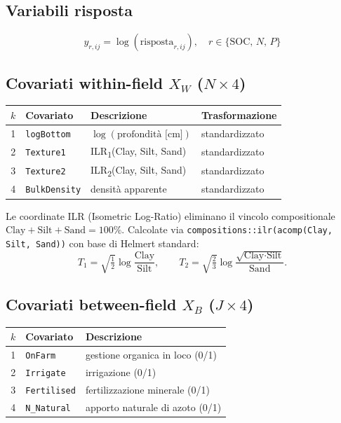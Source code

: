\documentclass[11pt, a4paper]{article}
\newcommand{\SOC}{\mathrm{SOC}}
\begin{document}
\subsection{Variabili risposta}

\[
  y_{r,ij} = \log(\text{risposta}_{r,ij}), \quad r \in \{\SOC,\, N,\, P\}
\]

\subsection{Covariati within-field $X_W$ ($N \times 4$)}

\medskip
\begin{tabular}{@{}clll@{}}
\toprule
$k$ & Covariato & Descrizione & Trasformazione \\
\midrule
1 & \texttt{logBottom} & $\log(\text{profondità [cm]})$ & standardizzato \\
2 & \texttt{Texture1}  & ILR\textsubscript{1}(Clay, Silt, Sand) & standardizzato \\
3 & \texttt{Texture2}  & ILR\textsubscript{2}(Clay, Silt, Sand) & standardizzato \\
4 & \texttt{BulkDensity} & densità apparente & standardizzato \\
\bottomrule
\end{tabular}

\medskip
Le coordinate ILR (Isometric Log-Ratio) eliminano il vincolo compositionale
$\text{Clay} + \text{Silt} + \text{Sand} = 100\%$. Calcolate via
\texttt{compositions::ilr(acomp(Clay, Silt, Sand))} con base di Helmert standard:
\[
  T_1 = \sqrt{\tfrac{1}{2}} \log\!\frac{\text{Clay}}{\text{Silt}},
  \qquad
  T_2 = \sqrt{\tfrac{2}{3}} \log\!\frac{\sqrt{\text{Clay}\cdot\text{Silt}}}{\text{Sand}}.
\]

\subsection{Covariati between-field $X_B$ ($J \times 4$)}

\medskip
\begin{tabular}{@{}cll@{}}
\toprule
$k$ & Covariato & Descrizione \\
\midrule
1 & \texttt{OnFarm} & gestione organica in loco (0/1) \\
2 & \texttt{Irrigate} & irrigazione (0/1) \\
3 & \texttt{Fertilised} & fertilizzazione minerale (0/1) \\
4 & \texttt{N\_Natural} & apporto naturale di azoto (0/1) \\
\bottomrule
\end{tabular}
\end{document}
